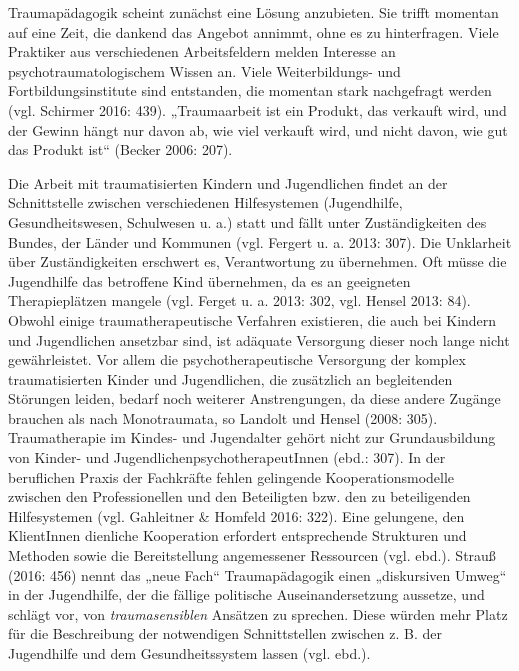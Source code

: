 Traumapädagogik scheint zunächst eine Lösung anzubieten. Sie trifft momentan auf eine Zeit, die dankend das Angebot annimmt, ohne es zu hinterfragen. Viele Praktiker aus verschiedenen Arbeitsfeldern melden Interesse an psychotraumatologischem Wissen an. Viele Weiterbildungs- und Fortbildungsinstitute sind entstanden, die momentan stark nachgefragt werden (vgl. Schirmer 2016: 439). „Traumaarbeit ist ein Produkt, das verkauft wird, und der Gewinn hängt nur davon ab, wie viel verkauft wird, und nicht davon, wie gut das Produkt ist“ (Becker 2006: 207).

Die Arbeit mit traumatisierten Kindern und Jugendlichen findet an der Schnittstelle zwischen verschiedenen Hilfesystemen (Jugendhilfe, Gesundheitswesen, Schulwesen u. a.) statt und fällt unter Zuständigkeiten des Bundes, der Länder und Kommunen (vgl. Fergert u. a. 2013: 307). Die Unklarheit über Zuständigkeiten erschwert es, Verantwortung zu übernehmen. Oft müsse die Jugendhilfe das betroffene Kind übernehmen, da es an geeigneten Therapieplätzen mangele (vgl. Ferget u. a. 2013: 302, vgl. Hensel 2013: 84). Obwohl einige traumatherapeutische Verfahren existieren, die auch bei Kindern und Jugendlichen ansetzbar sind, ist adäquate Versorgung dieser noch lange nicht gewährleistet. Vor allem die psychotherapeutische Versorgung der komplex traumatisierten Kinder und Jugendlichen, die zusätzlich an begleitenden Störungen leiden, bedarf noch weiterer Anstrengungen, da diese andere Zugänge brauchen als nach Monotraumata, so Landolt und Hensel (2008: 305). Traumatherapie im Kindes- und Jugendalter gehört nicht zur Grundausbildung von Kinder- und JugendlichenpsychotherapeutInnen (ebd.: 307). In der beruflichen Praxis der Fachkräfte fehlen gelingende Kooperationsmodelle zwischen den Professionellen und den Beteiligten bzw. den zu beteiligenden Hilfesystemen (vgl. Gahleitner \& Homfeld 2016: 322). Eine gelungene, den KlientInnen dienliche Kooperation erfordert entsprechende Strukturen und Methoden sowie die Bereitstellung angemessener Ressourcen (vgl. ebd.). Strauß (2016: 456) nennt das „neue Fach“ Traumapädagogik einen „diskursiven Umweg“ in der Jugendhilfe, der die fällige politische Auseinandersetzung aussetze, und schlägt vor, von \textit{traumasensiblen} Ansätzen zu sprechen. Diese würden mehr Platz für die Beschreibung der notwendigen Schnittstellen zwischen z. B. der Jugendhilfe und dem Gesundheitssystem lassen (vgl. ebd.).

